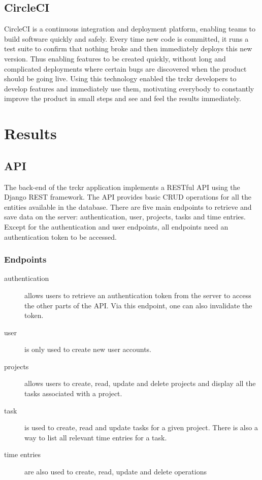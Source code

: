 \documentclass[bibliography=totoc, listof=totocnumbered]{scrartcl}
\begin{document}
\subsection{CircleCI}
CircleCI is a continuous integration and deployment platform, enabling teams to
build software quickly and safely.\cite{circleci} Every time new code is
committed, it runs a test suite to confirm that nothing broke and then
immediately deploys this new version. Thus enabling features to be created
quickly, without long and complicated deployments where certain bugs are
discovered when the product should be going live. Using this technology enabled
the trckr developers to develop features and immediately use them, motivating
everybody to constantly improve the product in small steps and see and feel the
results immediately.

\section{Results}

\subsection{API}
The back-end of the trckr application implements a RESTful API using the Django
REST framework. The API provides basic CRUD operations for all the entities
available in the database. There are five main endpoints to retrieve and save
data on the server: authentication, user, projects, tasks and time entries.
Except for the authentication and user endpoints, all endpoints need an
authentication token to be accessed.

\subsubsection{Endpoints}
\begin{description}
\item[authentication] allows users to retrieve an authentication token from the
  server to access the other parts of the API. Via this endpoint, one can also
  invalidate the token.
\item[user] is only used to create new user accounts.
\item[projects] allows users to create, read, update and delete projects and
  display all the tasks associated with a project.
\item[task] is used to create, read and update tasks for a given project. There
  is also a way to list all relevant time entries for a task.
\item[time entries] are also used to create, read, update and delete operations
\end{description}
\end{document}
